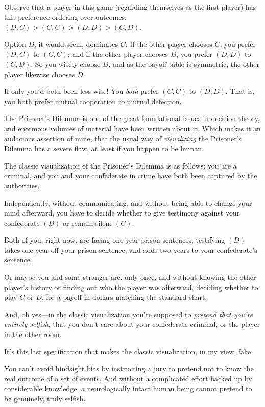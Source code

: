 {
 Observe that a player in this game (regarding themselves as the
first player) has this preference ordering over outcomes: $(D,C)
> (C,C) > (D,D) > (C,D)$.}

{
 Option $D$, it would seem, dominates $C$: If the other player chooses
$C$, you prefer $(D,C)$ to $(C,C)$; and if the other player chooses $D$, you
prefer $(D,D)$ to $(C,D)$. So you wisely choose $D$, and as the payoff table
is symmetric, the other player likewise chooses $D$.}

{
 If only you'd both been less wise! You
\textit{both} prefer $(C,C)$ to $(D,D)$. That is, you both prefer mutual
cooperation to mutual defection.}

{
 The Prisoner's Dilemma is one of the great
foundational issues in decision theory, and enormous volumes of
material have been written about it. Which makes it an audacious
assertion of mine, that the usual way of \textit{visualizing} the
Prisoner's Dilemma has a severe flaw, at least if you
happen to be human.}

{
 The classic visualization of the Prisoner's
Dilemma is as follows: you are a criminal, and you and your confederate
in crime have both been captured by the authorities.}

{
 Independently, without communicating, and without being able to
change your mind afterward, you have to decide whether to give
testimony against your confederate $(D)$ or remain silent $(C)$.}

{
 Both of you, right now, are facing one-year prison sentences;
testifying $(D)$ takes one year off your prison sentence, and adds two
years to your confederate's sentence.}

{
 Or maybe you and some stranger are, only once, and without knowing
the other player's history or finding out who the
player was afterward, deciding whether to play $C$ or $D$, for a payoff in
dollars matching the standard chart.}

{
 And, oh yes---in the classic visualization you're
supposed to \textit{pretend that you're entirely
selfish}, that you don't care about your confederate
criminal, or the player in the other room.}

{
 It's this last specification that makes the
classic visualization, in my view, fake.}

{
 You can't avoid hindsight bias by instructing a
jury to pretend not to know the real outcome of a set of events. And
without a complicated effort backed up by considerable knowledge, a
neurologically intact human being cannot pretend to be genuinely, truly
selfish.}


